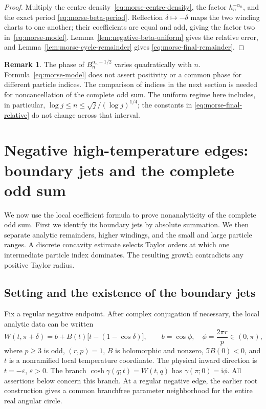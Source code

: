 \documentclass[11pt]{article}
\numberwithin{equation}{section}
\theoremstyle{definition}
\newtheorem{remark}[theorem]{Remark}
\newcommand{\ii}{\mathrm i}
\newcommand{\eps}{\varepsilon}
\begin{document}
\begin{proof}
Multiply the centre density~\eqref{eq:morse-centre-density}, the
factor $h_n^{-\alpha_n}$, and the exact period
\eqref{eq:morse-beta-period}.  Reflection $\delta\mapsto-\delta$
maps the two winding charts to one another; their coefficients are
equal and add, giving the factor two in~\eqref{eq:morse-model}.
Lemma~\ref{lem:negative-beta-uniform} gives the relative error, and
Lemma~\ref{lem:morse-cycle-remainder} gives
\eqref{eq:morse-final-remainder}.
\end{proof}

\begin{remark}
The phase of $B_n^{\alpha_n-1/2}$ varies quadratically with $n$.
Formula~\eqref{eq:morse-model} does not assert positivity or a common
phase for different particle indices.  The comparison of indices in
the next section is needed for noncancellation of the complete odd
sum.  The uniform regime here includes, in particular,
$\log j\le n\le\sqrt j/(\log j)^{1/4}$; the constants in
\eqref{eq:morse-final-relative} do not change across that interval.
\end{remark}



\section{Negative high-temperature edges: boundary jets and the complete odd sum}
\label{sec:jets}

We now use the local coefficient formula to prove nonanalyticity of the
complete odd sum. First we identify its boundary jets by absolute
summation. We then separate analytic remainders, higher windings, and
the small and large particle ranges. A discrete concavity estimate
selects Taylor orders at which one intermediate particle index dominates.
The resulting growth contradicts any positive Taylor radius.

\subsection{Setting and the existence of the boundary jets}

Fix a regular negative endpoint. After complex conjugation if necessary,
the local analytic data can be written
\begin{equation}\label{eq:jets_setting}
 W(t,\pi+\delta)=b+B(t)\bigl[t-(1-\cos\delta)\bigr],\qquad
 b=\cos\phi,\quad \phi=\frac{2\pi r}{p}\in(0,\pi),
\end{equation}
where $p\ge3$ is odd, $(r,p)=1$, $B$ is holomorphic and nonzero,
$\Im B(0)<0$, and $t$ is a nonramified local temperature coordinate.
The physical inward direction is $t=-\eps$, $\eps>0$. The branch
$\cosh\gamma(q;t)=W(t,q)$ has
$\gamma(\pi;0)=\ii\phi$. All assertions below concern this branch.
At a regular negative edge, the earlier root construction gives a common
branchfree parameter neighborhood for the entire real angular circle.
\end{document}
